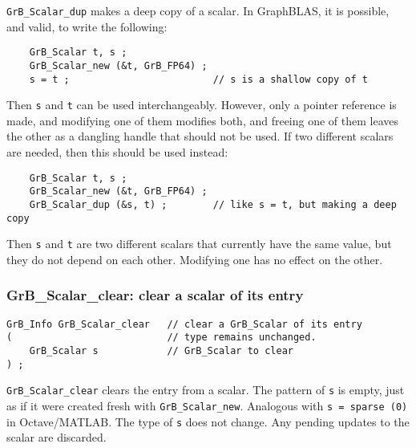 \documentclass[12pt]{article}
\begin{document}
{\verb'GrB_Scalar_dup' makes a deep copy of a scalar.
In GraphBLAS, it is possible, and valid, to write the following:

    {\footnotesize
    \begin{verbatim}
    GrB_Scalar t, s ;
    GrB_Scalar_new (&t, GrB_FP64) ;
    s = t ;                         // s is a shallow copy of t  \end{verbatim}}

Then \verb's' and \verb't' can be used interchangeably.  However, only a pointer
reference is made, and modifying one of them modifies both, and freeing one of
them leaves the other as a dangling handle that should not be used.
If two different scalars are needed, then this should be used instead:

    {\footnotesize
    \begin{verbatim}
    GrB_Scalar t, s ;
    GrB_Scalar_new (&t, GrB_FP64) ;
    GrB_Scalar_dup (&s, t) ;        // like s = t, but making a deep copy \end{verbatim}}

Then \verb's' and \verb't' are two different scalars that currently have
the same value, but they do not depend on each other.  Modifying one has no
effect on the other.

\subsubsection{{\sf GrB\_Scalar\_clear:} clear a scalar of its entry}
\label{scalar_clear}

\begin{mdframed}[userdefinedwidth=6in]
{\footnotesize
\begin{verbatim}
GrB_Info GrB_Scalar_clear   // clear a GrB_Scalar of its entry
(                           // type remains unchanged.
    GrB_Scalar s            // GrB_Scalar to clear
) ;
\end{verbatim}
} \end{mdframed}

\verb'GrB_Scalar_clear' clears the entry from a scalar.  The pattern of
\verb's' is empty, just as if it were created fresh with \verb'GrB_Scalar_new'.
Analogous with \verb's = sparse (0)' in Octave/MATLAB.  The type of \verb's' does not
change.  Any pending updates to the scalar are discarded.

\newpage
}
\end{document}
